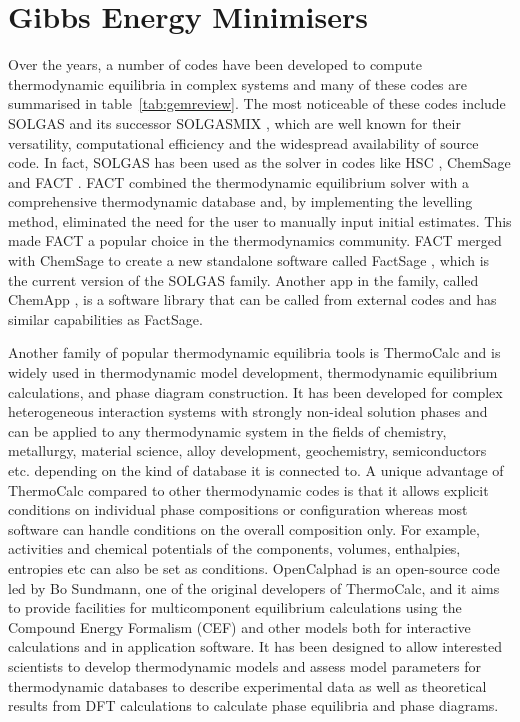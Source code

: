 	
\section{Gibbs Energy Minimisers}
	Over the years, a number of codes have been developed to compute thermodynamic equilibria in complex systems and many of these codes are summarised in table~\ref{tab:gemreview}. The most noticeable of these codes include SOLGAS \cite{Eriksson71} and its successor SOLGASMIX \cite{Eriksson:1975aa}, which are well known for their versatility, computational efficiency and the widespread availability of source code. In fact, SOLGAS has been used as the solver in codes like HSC \cite{HSCSoftware:aa}, ChemSage \cite{Eriksson90} and FACT \cite{Thompson83}. FACT combined the thermodynamic equilibrium solver with a comprehensive thermodynamic database and, by implementing the levelling method, eliminated the need for the user to manually input initial estimates. This made FACT a popular choice in the thermodynamics community. FACT merged with ChemSage to create a new standalone software called FactSage \cite{Bale02}, which is the current version of the SOLGAS family. Another app in the family, called ChemApp \cite{Eriksson:2008aa,Petersen:2007aa}, is a software library that can be called from external codes and has similar capabilities as FactSage.
	
	Another family of popular thermodynamic equilibria tools is ThermoCalc \cite{ANDERSSON2002273} and is widely used in thermodynamic model development, thermodynamic equilibrium calculations, and  phase diagram construction. It has been developed for complex heterogeneous interaction systems with strongly non-ideal solution phases and can be applied to any thermodynamic system in the fields of chemistry, metallurgy, material science, alloy development, geochemistry, semiconductors etc. depending on the kind of database it is connected to. A unique advantage of ThermoCalc compared to other thermodynamic codes is that it allows explicit conditions on individual phase compositions or configuration whereas most software can handle conditions on the overall composition only. For example, activities and chemical potentials of the components, volumes, enthalpies, entropies etc can also be set as conditions.  OpenCalphad \cite{Sundman:2015aa} is an open-source code led by Bo Sundmann, one of the original developers of ThermoCalc, and it aims to provide facilities for multicomponent equilibrium calculations using the Compound Energy Formalism (CEF) and other models both for interactive calculations and in application software. It has been designed to allow interested scientists to develop thermodynamic models and assess model parameters for thermodynamic databases to describe experimental data as well as theoretical results from DFT calculations to calculate phase equilibria and phase diagrams.

